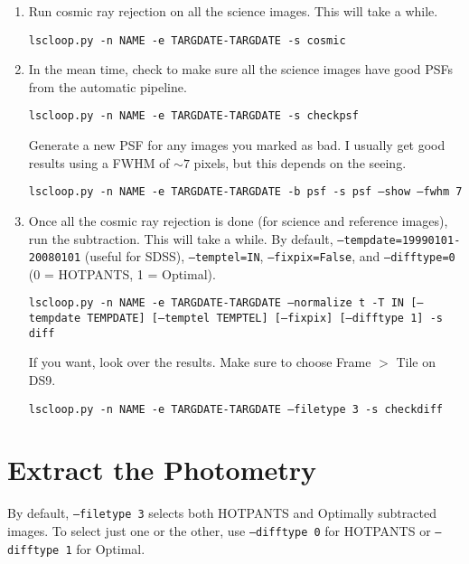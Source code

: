 \begin{enumerate}
\item Run cosmic ray rejection on all the science images. This will take a while.

{\tt lscloop.py -n NAME -e TARGDATE-TARGDATE -s cosmic}

\item In the mean time, check to make sure all the science images have good PSFs from the automatic pipeline.

{\tt lscloop.py -n NAME -e TARGDATE-TARGDATE -s checkpsf}

Generate a new PSF for any images you marked as bad. I usually get good results using a FWHM of $\sim 7$ pixels, but this depends on the seeing.

{\tt lscloop.py -n NAME -e TARGDATE-TARGDATE -b psf -s psf --show --fwhm 7}

\item Once all the cosmic ray rejection is done (for science and reference images), run the subtraction. This will take a while. By default, {\tt --tempdate=19990101-20080101} (useful for SDSS), {\tt --temptel=IN}, {\tt --fixpix=False}, and {\tt --difftype=0} (0 = HOTPANTS, 1 = Optimal).

{\tt lscloop.py -n NAME -e TARGDATE-TARGDATE --normalize t -T IN [--tempdate TEMPDATE] [--temptel TEMPTEL] [--fixpix] [--difftype 1] -s diff}

If you want, look over the results. Make sure to choose Frame $>$ Tile on DS9.

{\tt lscloop.py -n NAME -e TARGDATE-TARGDATE --filetype 3 -s checkdiff}
\end{enumerate}

\section{Extract the Photometry}
By default, {\tt --filetype 3} selects both HOTPANTS and Optimally subtracted images. To select just one or the other, use {\tt --difftype 0} for HOTPANTS or {\tt --difftype 1} for Optimal.

